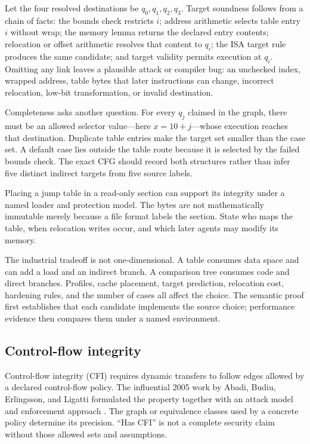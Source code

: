 Let the four resolved destinations be \(q_0,q_1,q_2,q_3\). Target soundness
follows from a chain of facts: the bounds check restricts \(i\); address
arithmetic selects table entry \(i\) without wrap; the memory lemma returns the
declared entry contents; relocation or offset arithmetic resolves that content
to \(q_i\); the ISA target rule produces the same candidate; and target
validity permits execution at \(q_i\). Omitting any link leaves a plausible
attack or compiler bug: an unchecked index, wrapped address, table bytes that
later instructions can change, incorrect relocation, low-bit transformation,
or invalid destination.

Completeness asks another question. For every \(q_j\) claimed in the graph,
there must be an allowed selector value—here \(x=10+j\)—whose execution reaches
that destination. Duplicate table entries make the target set smaller than the
case set. A default case lies outside the table route because it is selected by
the failed bounds check. The exact CFG should record both structures rather
than infer five distinct indirect targets from five source labels.

\begin{warning}[title={Read-only is a temporal premise, not a table adjective}]
Placing a jump table in a read-only section can support its integrity under a
named loader and protection model. The bytes are not mathematically immutable
merely because a file format labels the section. State who maps the table,
when relocation writes occur, and which later agents may modify its memory.
\end{warning}

The industrial tradeoff is not one-dimensional. A table consumes data space
and can add a load and an indirect branch. A comparison tree consumes code and
direct branches. Profiles, cache placement, target prediction, relocation
cost, hardening rules, and the number of cases all affect the choice. The
semantic proof first establishes that each candidate implements the source
choice; performance evidence then compares them under a named environment.

\subsection{Control-flow integrity}

Control-flow integrity (CFI) requires dynamic transfers to follow edges allowed
by a declared control-flow policy. The influential 2005 work by Abadi, Budiu,
Erlingsson, and Ligatti formulated the property together with an attack model
and enforcement approach \autocite{abadi2005cfi}. The graph or equivalence
classes used by a concrete policy determine its precision. ``Has CFI'' is not a
complete security claim without those allowed sets and assumptions.

